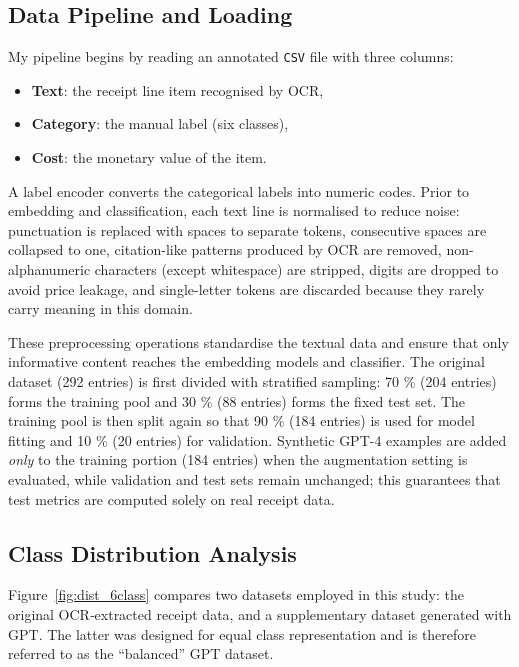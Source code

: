 \documentclass{SGGW-thesis-EN}
\begin{document}
\subsection{Data Pipeline and Loading}
My pipeline begins by reading an annotated \texttt{CSV} file with three columns:
\begin{itemize}
  \item \textbf{Text}: the receipt line item recognised by OCR,
  \item \textbf{Category}: the manual label (six classes), 
  \item \textbf{Cost}: the monetary value of the item.
\end{itemize}
A label encoder converts the categorical labels into numeric codes. Prior to embedding and classification, each text
line is normalised to reduce noise: punctuation is replaced with spaces to separate tokens, consecutive spaces are
collapsed to one, citation-like patterns produced by OCR are removed, non-alphanumeric characters (except whitespace)
are stripped, digits are dropped to avoid price leakage, and single-letter tokens are discarded because they rarely
carry meaning in this domain.

These preprocessing operations standardise the textual data and ensure that only informative content reaches the
embedding models and classifier.  The original dataset (292 entries) is first divided with stratified sampling: 70 \%
(204 entries) forms the training pool and 30 \% (88 entries) forms the fixed test set.  The training pool is then split
again so that 90 \% (184 entries) is used for model fitting and 10 \% (20 entries) for validation.  Synthetic GPT-4
examples are added \emph{only} to the training portion (184 entries) when the augmentation setting is evaluated, while
validation and test sets remain unchanged; this guarantees that test metrics are computed solely on real receipt data.


\subsection{Class Distribution Analysis}
Figure~\ref{fig:dist_6class} compares two datasets employed in this study: 
the original OCR‐extracted receipt data, and a supplementary dataset generated with GPT. The latter was designed for equal class
representation and is therefore referred to as the “balanced” GPT dataset.
\end{document}
